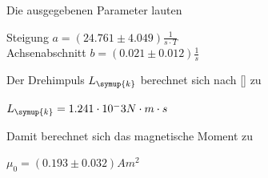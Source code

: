 Die ausgegebenen Parameter lauten\\
\begin{centering}
Steigung $a = (24.761 ± 4.049) \frac{1}{s \cdot T}$\\
Achsenabschnitt $b =(0.021 ± 0.012) \frac{1}{s}$\\
\end{centering}

Der Drehimpuls $L_{\symup{k}}$ berechnet sich nach \ref{} zu\\

\begin{centering}

  $L_{\symup{k}} = 1.241 \cdot 10^-3 N\cdot m\cdot s$\\

\end{centering}

Damit berechnet sich das magnetische Moment zu\\

\begin{centering}

  $\mu_0 = (0.193 \pm 0.032) Am^2$\\
  
\end{centering}
 


